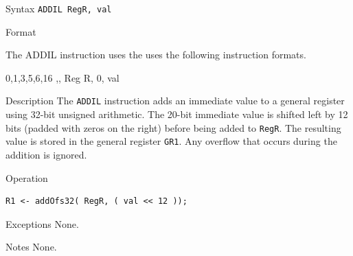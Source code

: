 %
%
\pagebreak
{}

\begin{iPageDescEntry}{Syntax}
\texttt{ADDIL RegR, val }
\end{iPageDescEntry}

\begin{iPageDescEntry}{Format}

The ADDIL instruction uses the uses the following instruction formats. \\
	
\begin{flushleft}
\drawInstrFormat
  	{0,1,3,5,6,16}
  	{\OpCodeGrpALU,\OpCodeADDIL, Reg R, 0, val }
\end{flushleft}	
\end{iPageDescEntry}

\begin{iPageDescEntry}{Description}
The \texttt{ADDIL} instruction adds an immediate value to a general register using 32-bit unsigned arithmetic. The 20-bit immediate value is shifted left by 12 bits (padded with zeros on the right) before being added to \texttt{RegR}. The resulting value is stored in the general register \texttt{GR1}. Any overflow that occurs during the addition is ignored.

\end{iPageDescEntry}

\begin{iPageDescOpEntry}{Operation}
\begin{lstlisting}[style=iPageOpStyle]
R1 <- addOfs32( RegR, ( val << 12 ));
\end{lstlisting}
\end{iPageDescOpEntry}


\begin{iPageDescEntry}{Exceptions}
None.
\end{iPageDescEntry}


\begin{iPageDescEntry}{Notes}
None. 
\end{iPageDescEntry}
